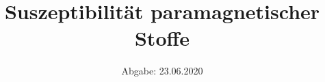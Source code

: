 

\subject{Versuch V606}
\title{Suszeptibilität paramagnetischer Stoffe}
\date{%
  Abgabe: 23.06.2020
}



\maketitle
\thispagestyle{empty}
\tableofcontents
\newpage






\newpage
\printbibliography{}


